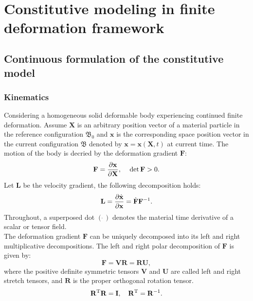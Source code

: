 \chapter{Constitutive modeling in finite deformation framework}

\section{Continuous formulation of the constitutive model}
\subsection{Kinematics}
\noindent
Considering a homogeneous solid deformable body experiencing continued finite deformation.
Assume $\mathbf{X}$ is an arbitrary position vector of a material particle in the reference configuration $\mathfrak{B_0}$ and $\mathbf{x}$ is the corresponding space position vector in the current configuration $\mathfrak{B}$ denoted by $\mathbf{x}=\mathbf{x}\left(\mathbf{X},t\right)$ at current time.
The motion of the body is decried by the deformation gradient $\mathbf{F}$:
\begin{equation}
{\mathbf{F}} = \frac{{\partial {\mathbf{x}}}}{{\partial {\mathbf{X}}}}, \rm{\quad} \det {\mathbf{F}}>0.
\end{equation}
Let $\mathbf{L}$ be the velocity gradient, the following decomposition holds:
\begin{equation}
{\mathbf{L}} = \frac{{\partial {\dot {\bf{x}}}}}{{\partial {\mathbf{x}}}} = {\dot {\bf{F}}}{{\mathbf{F}}^{ - 1}}.
\end{equation}
Throughout, a superposed dot $\left(\dot{\ }\right)$ denotes the material time derivative of a scalar or tensor field.\\
The deformation gradient $\mathbf{F}$ can be uniquely decomposed into its left and right multiplicative decompositions.
The left and right polar decomposition of $\mathbf{F}$ is given by:
\begin{equation}
{\mathbf{F}} = {\mathbf{VR}} = {\mathbf{RU}},
\end{equation}
where the positive definite symmetric tensors $\mathbf{V}$ and $\mathbf{U}$ are called left and right stretch tensors, and $\mathbf{R}$ is the proper orthogonal rotation tensor.
\begin{equation}
{{\mathbf{R}}^{\rm{T}}} {\mathbf{R}} = {\mathbf{I}}, \rm{\quad} {{\mathbf{R}}^{\rm{T}}} = {{\mathbf{R}}^{ - 1}}.
\end{equation}
